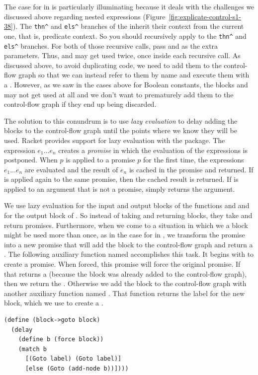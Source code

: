 \documentclass[11pt]{book}
\begin{document}
The case for  in  is particularly
illuminating because it deals with the challenges we discussed above
regarding nested  expressions
(Figure~\ref{fig:explicate-control-s1-38}).  The \lstinline{thn^} and
\lstinline{els^} branches of the  inherit their context from
the current one, that is, predicate context. So you should recursively
apply  to the \lstinline{thn^} and
\lstinline{els^} branches. For both of those recursive calls, pass
 and  as the extra parameters. Thus, 
and  may get used twice, once inside each recursive call. As
discussed above, to avoid duplicating code, we need to add them to the
control-flow graph so that we can instead refer to them by name and
execute them with a . However, as we saw in the cases above
for Boolean constants, the blocks  and  may not
get used at all and we don't want to prematurely add them to the
control-flow graph if they end up being discarded.

The solution to this conundrum is to use \emph{lazy
  evaluation}\citep{Friedman:1976aa} to delay
adding the blocks to the control-flow graph until the points where we
know they will be used. Racket provides support for lazy evaluation
with the
\href{https://docs.racket-lang.org/reference/Delayed_Evaluation.html}{}
package. The expression  $e_1 \ldots e_n$\key{)}
 creates a \emph{promise} in which the
evaluation of the expressions is postponed. When 
$p$\key{)} is applied to a promise $p$ for the first
time, the expressions $e_1 \ldots e_n$ are evaluated and the result of
$e_n$ is cached in the promise and returned. If  is
applied again to the same promise, then the cached result is returned.
If  is applied to an argument that is not a promise,
 simply returns the argument.

We use lazy evaluation for the input and output blocks of the
functions  and  and for
the output block of . So instead of taking and
returning blocks, they take and return promises. Furthermore, when we
come to a situation in which we a block might be used more than once,
as in the case for  in , we transform
the promise into a new promise that will add the block to the
control-flow graph and return a .  The following auxiliary
function named  accomplishes this task. It begins
with  to create a promise. When forced, this promise will
force the original promise. If that returns a  (because the
block was already added to the control-flow graph), then we return the
. Otherwise we add the block to the control-flow graph with
another auxiliary function named . That function
returns the label for the new block, which we use to create a
.
\begin{lstlisting}
(define (block->goto block)
  (delay
    (define b (force block))
    (match b
      [(Goto label) (Goto label)]
      [else (Goto (add-node b))])))
\end{lstlisting}
\end{document}
